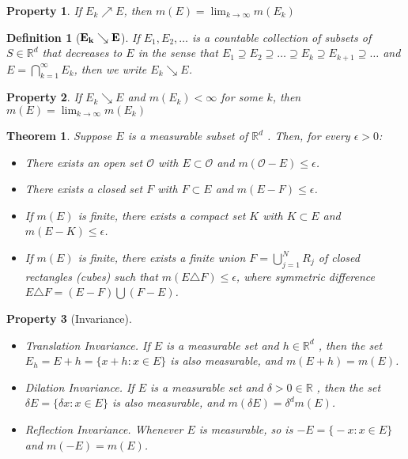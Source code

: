 \documentclass{report}
\theoremstyle{upthm}
\newtheorem{thm}{Theorem}
\newtheorem{defn}{Definition}
\newtheorem{property}{Property}
\newcommand{\reals}{\mathbb{R}}
\newcommand{\calO}{{\mathcal{O}}}
\newcommand{\set}[1]{\big\lbrace #1 \big\rbrace}
\newcommand{\union}{\bigcup}
\newcommand{\intersection}{\bigcap}
\begin{document}
\begin{property} 
	If $E_k \nearrow E$, then $m(E) = \lim_{k \rightarrow \infty} m(E_k)$
\end{property}

\begin{defn}[$\bf E_k \searrow E$]
	If $E_1, E_2, \dots $ is a countable collection of subsets of $S \in \reals^d$ that decreases to $E$ in the sense that $ E_1 \supseteq E_2 \supseteq \dots \supseteq E_k \supseteq E_{k+1} \supseteq \dots $  and $E = \intersection_{k=1}^{\infty} E_k$, then we write $E_k \searrow E$.
\end{defn}

\begin{property} 
	If $E_k \searrow E$ and $m(E_k) < \infty$ for some $k$, then $m(E) = \lim_{k \rightarrow \infty} m(E_k)$
\end{property}

\begin{thm}
	Suppose $E$ is a measurable subset of $\reals^d$ . Then, for every $\epsilon > 0$:
	\begin{itemize}
		\item There exists an open set $\calO$ with $E \subset \calO$ and $m(\calO - E) \leq \epsilon$.
		\item There exists a closed set $F$ with $F \subset E$ and $m(E - F ) \leq \epsilon$.
		\item If $m(E)$ is finite, there exists a compact set $K$ with $K \subset E$ and $m(E - K) \leq \epsilon$.
		\item If $m(E)$ is finite, there exists a finite union $F = \union_{j=1}^N R_j$ of closed rectangles (cubes) such that $m (E \triangle F) \leq \epsilon$, where symmetric difference $E \triangle F = (E - F) \union (F - E)$.
	\end{itemize}
\end{thm}

\begin{property}[Invariance]
	\item
	\begin{itemize}
		\item Translation Invariance. If $E$ is a measurable set and $h \in \reals^d$ , then the set $E_h = E + h = \set{x + h : x \in E}$ is also measurable, and $m(E + h) = m(E)$.
		\item Dilation Invariance. If $E$ is a measurable set and $\delta > 0 \in \reals$ , then the set $\delta E = \set{\delta x : x \in E}$ is also measurable, and $m(\delta E) = \delta^d m(E)$.
		\item Reflection Invariance. Whenever $E$ is measurable, so is $ -E = \set{-x : x \in E}$ and $m(-E) = m(E)$.
	\end{itemize}
\end{property}
\end{document}
